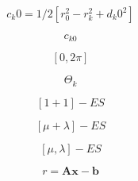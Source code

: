 \documentclass{article}
\begin{document}
\[ c_k0 = 1/2[r_0^2-r_k^2+d_k0^2] \]
\pagebreak

\[c_{k0}\]
\pagebreak

\[[0,2\pi]\]
\pagebreak

\[ \Theta_k \]
\pagebreak

\[[1+1]-ES\]
\pagebreak

\[[\mu+\lambda]-ES\]
\pagebreak

\[[\mu,\lambda]-ES\]
\pagebreak

\[r=\mathbf{Ax}-\mathbf{b}\]
\pagebreak
\end{document}

